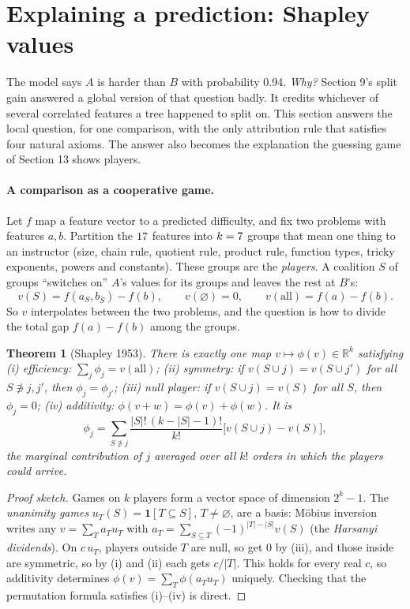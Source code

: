 \documentclass[11pt]{article}
\theoremstyle{definition}
\theoremstyle{plain}
\newtheorem{theorem}[definition]{Theorem}
\theoremstyle{remark}
\newcommand{\R}{\mathbb{R}}
\renewcommand{\_}{\oldunderscore\allowbreak}
\begin{document}
\section{Explaining a prediction: Shapley values}
\label{sec:shapley}

The model says $A$ is harder than $B$ with probability 0.94. \emph{Why?} Section 9's split gain answered a global version of that question badly. It credits
whichever of several correlated features a tree happened to split on. This section answers the local question, for one comparison, with the only
attribution rule that satisfies four natural axioms. The answer also becomes the explanation the guessing game of Section 13 shows players.

\paragraph{A comparison as a cooperative game.}
Let $f$ map a feature vector to a predicted difficulty, and fix two problems with features $a,b$. Partition the $17$ features into $k=7$ groups that
mean one thing to an instructor (size, chain rule, quotient rule, product rule, function types, tricky exponents, powers and constants). These groups are the \emph{players}. A coalition $S$ of
groups ``switches on'' $A$'s values for its groups and leaves the rest at $B$'s:
\[
  v(S)=f(a_S,b_{\bar S})-f(b),\qquad v(\varnothing)=0,\qquad v(\text{all})=f(a)-f(b).
\]
So $v$ interpolates between the two problems, and the question is how to divide the total gap $f(a)-f(b)$ among the groups.

\begin{theorem}[Shapley 1953]
There is exactly one map $v\mapsto\phi(v)\in\R^k$ satisfying
(i) \emph{efficiency}: $\sum_j\phi_j=v(\text{all})$;
(ii) \emph{symmetry}: if $v(S\cup j)=v(S\cup j')$ for all $S\not\ni j,j'$, then $\phi_j=\phi_{j'}$;
(iii) \emph{null player}: if $v(S\cup j)=v(S)$ for all $S$, then $\phi_j=0$;
(iv) \emph{additivity}: $\phi(v+w)=\phi(v)+\phi(w)$. It is
\[
  \phi_j=\sum_{S\not\ni j}\frac{|S|!\,(k-|S|-1)!}{k!}\bigl[v(S\cup j)-v(S)\bigr],
\]
the marginal contribution of $j$ averaged over all $k!$ orders in which the players could arrive.
\end{theorem}
\begin{proof}[Proof sketch]
Games on $k$ players form a vector space of dimension $2^k-1$. The \emph{unanimity games} $u_T(S)=\mathbf 1[T\subseteq S]$, $T\ne\varnothing$, are a basis: Möbius inversion
writes any $v=\sum_Ta_Tu_T$ with $a_T=\sum_{S\subseteq T}(-1)^{|T|-|S|}v(S)$ (the \emph{Harsanyi dividends}). On $c\,u_T$, players outside $T$ are null, so get 0 by (iii), and those inside are
symmetric, so by (i) and (ii) each gets $c/|T|$. This holds for every real $c$, so additivity determines $\phi(v)=\sum_T\phi(a_Tu_T)$ uniquely.
Checking that the permutation formula satisfies (i)--(iv) is direct.
\end{proof}
\end{document}
